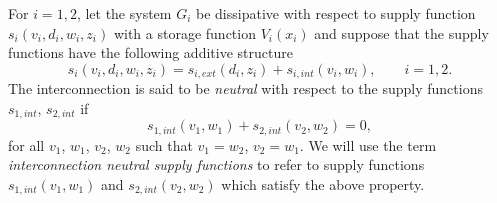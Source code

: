 \documentclass[11pt,a4paper,oneside,DIV=12,headings=small]{scrartcl}
\theoremstyle{plain}
\begin{document}
 
For $i=1,2$, let the system $G_i$ be dissipative with respect to supply function $s_i(v_i,d_i,w_i,z_i)$ with a storage function $V_i(x_i)$ and suppose that the supply functions have the following additive structure
\begin{equation}
\label{Q1}
s_i(v_i,d_i,w_i,z_i)=s_{i,ext}(d_i,z_i)+s_{i,int}(v_i,w_i), \quad \quad i=1,2.
\end{equation}
The interconnection is said to be \emph{neutral} with respect to the supply functions $s_{1,int}$, $s_{2,int}$ if
\begin{equation}
\label{Q2}
s_{1,int}(v_1,w_1)+s_{2,int}(v_2,w_2)=0,
\end{equation}
for all $v_1$, $w_1$, $v_2$, $w_2$ such that $v_1=w_2$, $v_2=w_1$. We will use the term \emph{interconnection neutral supply functions} to refer to supply functions $s_{1,int}(v_1,w_1)$ and $s_{2,int}(v_2,w_2)$ which satisfy the above property. 
\end{document}
